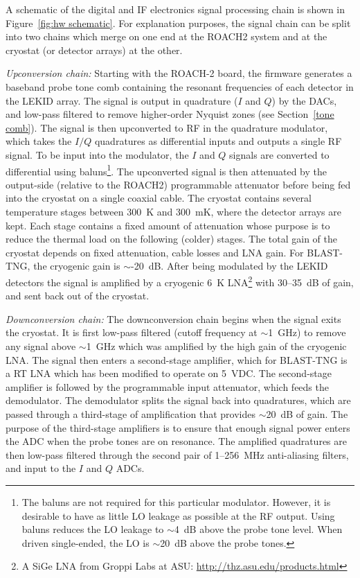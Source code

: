 \vspace{5mm}

A schematic of the digital and IF electronics signal processing chain is shown in Figure~\ref{fig:hw schematic}. For explanation purposes, the signal chain can be split into two chains which merge on one end at the ROACH2 system and at the cryostat (or detector arrays) at the other.

\textit{Upconversion chain:} Starting with the ROACH-2 board, the firmware generates a baseband probe tone comb containing the resonant frequencies of each detector in the LEKID array. The signal is output in quadrature ($I$ and $Q$) by the DACs, and low-pass filtered to remove higher-order Nyquist zones (see Section~\ref{tone comb}). The signal is then upconverted to RF in the quadrature modulator, which takes the $I/Q$ quadratures as differential inputs and outputs a single RF signal. To be input into the modulator, the $I$ and $Q$ signals are converted to differential using baluns\footnote{The baluns are not required for this particular modulator. However, it is desirable to have as little LO leakage as possible at the RF output. Using baluns reduces the LO leakage to $\sim$4~dB above the probe tone level. When driven single-ended, the LO is $\sim$20~dB above the probe tones.}. The upconverted signal is then attenuated by the output-side (relative to the ROACH2) programmable attenuator before being fed into the cryostat on a single coaxial cable. The cryostat contains several temperature stages between 300~K and 300~mK, where the detector arrays are kept. Each stage contains a fixed amount of attenuation whose purpose is to reduce the thermal load on the following (colder) stages. The total gain of the cryostat depends on fixed attenuation, cable losses and LNA gain. For BLAST-TNG, the cryogenic gain is $\sim$-20~dB. After being modulated by the LEKID detectors the signal is amplified by a cryogenic 6~K LNA\footnote{A SiGe LNA from Groppi Labs at ASU\@: \url{http://thz.asu.edu/products.html}} with 30--35~dB of gain, and sent back out of the cryostat.

\vspace{5mm}

\textit{Downconversion chain:} The downconversion chain begins when the signal exits the cryostat. It is first low-pass filtered (cutoff frequency at $\sim$1~GHz) to remove any signal above $\sim$1~GHz which was amplified by the high gain of the cryogenic LNA\@. The signal then enters a second-stage amplifier, which for BLAST-TNG is a RT LNA which has been modified to operate on  5~VDC\@. The second-stage amplifier is followed by the programmable input attenuator, which feeds the demodulator. The demodulator splits the signal back into quadratures, which are passed through a third-stage of amplification that provides $\sim$20~dB of gain. The purpose of the third-stage amplifiers is to ensure that enough signal power enters the ADC when the probe tones are on resonance. The amplified quadratures are then low-pass filtered through the second pair of 1--256~MHz anti-aliasing filters, and input to the $I$ and $Q$ ADCs.

